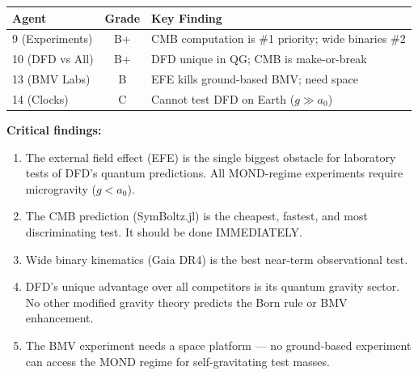 \documentclass[11pt,a4paper]{article}
\begin{document}
\begin{center}
\begin{tabular}{lcl}
\toprule
\textbf{Agent} & \textbf{Grade} & \textbf{Key Finding} \\
\midrule
9 (Experiments) & B+ & CMB computation is \#1 priority; wide binaries \#2 \\
10 (DFD vs All) & B+ & DFD unique in QG; CMB is make-or-break \\
13 (BMV Labs) & B & EFE kills ground-based BMV; need space \\
14 (Clocks) & C & Cannot test DFD on Earth ($g \gg a_0$) \\
\bottomrule
\end{tabular}
\end{center}

\textbf{Critical findings:}
\begin{enumerate}
\item The external field effect (EFE) is the single biggest obstacle for laboratory tests of DFD's quantum predictions. All MOND-regime experiments require microgravity ($g < a_0$).
\item The CMB prediction (SymBoltz.jl) is the cheapest, fastest, and most discriminating test. It should be done IMMEDIATELY.
\item Wide binary kinematics (Gaia DR4) is the best near-term observational test.
\item DFD's unique advantage over all competitors is its quantum gravity sector. No other modified gravity theory predicts the Born rule or BMV enhancement.
\item The BMV experiment needs a space platform --- no ground-based experiment can access the MOND regime for self-gravitating test masses.
\end{enumerate}
\end{document}
